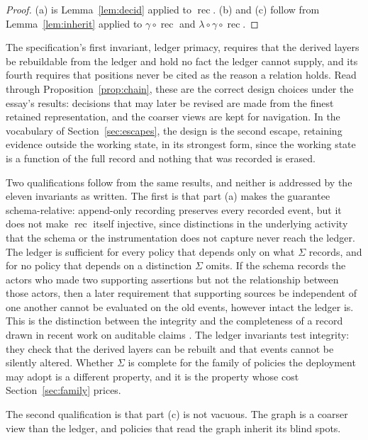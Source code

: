 \documentclass[11pt]{article}
\theoremstyle{definition}
\theoremstyle{remark}
\begin{document}
\begin{proof}
(a) is Lemma~\ref{lem:decid} applied to $\operatorname{rec}$. (b) and (c) follow from Lemma~\ref{lem:inherit} applied to $\gamma\circ\operatorname{rec}$ and $\lambda\circ\gamma\circ\operatorname{rec}$.
\end{proof}

The specification's first invariant, ledger primacy, requires that the derived layers be rebuildable from the ledger and hold no fact the ledger cannot supply, and its fourth requires that positions never be cited as the reason a relation holds. Read through Proposition~\ref{prop:chain}, these are the correct design choices under the essay's results: decisions that may later be revised are made from the finest retained representation, and the coarser views are kept for navigation. In the vocabulary of Section~\ref{sec:escapes}, the design is the second escape, retaining evidence outside the working state, in its strongest form, since the working state is a function of the full record and nothing that was recorded is erased.

Two qualifications follow from the same results, and neither is addressed by the eleven invariants as written. The first is that part (a) makes the guarantee schema-relative: append-only recording preserves every recorded event, but it does not make $\operatorname{rec}$ itself injective, since distinctions in the underlying activity that the schema or the instrumentation does not capture never reach the ledger. The ledger is sufficient for every policy that depends only on what $\Sigma$ records, and for no policy that depends on a distinction $\Sigma$ omits. If the schema records the actors who made two supporting assertions but not the relationship between those actors, then a later requirement that supporting sources be independent of one another cannot be evaluated on the old events, however intact the ledger is. This is the distinction between the integrity and the completeness of a record drawn in recent work on auditable claims \cite{auditable}. The ledger invariants test integrity: they check that the derived layers can be rebuilt and that events cannot be silently altered. Whether $\Sigma$ is complete for the family of policies the deployment may adopt is a different property, and it is the property whose cost Section~\ref{sec:family} prices.

The second qualification is that part (c) is not vacuous. The graph is a coarser view than the ledger, and policies that read the graph inherit its blind spots.
\end{document}
